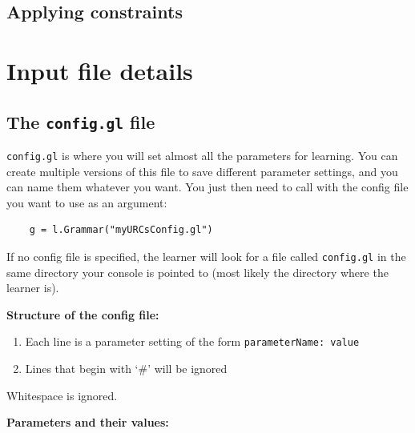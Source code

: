 \documentclass[12]{article}
\begin{document}
	\subsection{Applying constraints}

\section{Input file details}

\subsection{The \texttt{config.gl} file}

\texttt{config.gl} is where you will set almost all the parameters for learning.  You can create multiple versions of this file to save different parameter settings, and you can name them whatever you want.  You just then need to call  with the config file you want to use as an argument:

\begin{verbatim}
	g = l.Grammar("myURCsConfig.gl")
\end{verbatim}

If no config file is specified, the learner will look for a file called \texttt{config.gl} in the same directory your console is pointed to (most likely the directory where the learner is).

{\bf Structure of the config file:} 

\begin{enumerate}
	\item Each line is a parameter setting of the form \texttt{parameterName: value}
	\item Lines that begin with `\#' will be ignored
\end{enumerate}

Whitespace is ignored.

{\bf Parameters and their values:}
\end{document}
